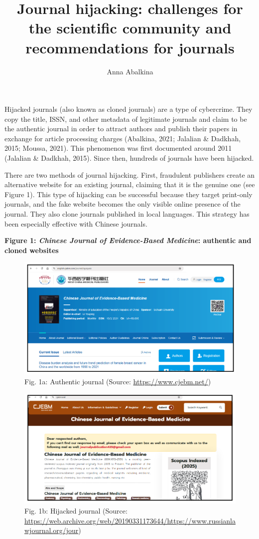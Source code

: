 \documentclass[a4paper,
fontsize=11pt,
oneside,
numbers=noperiodatend,
parskip=half-,
bibliography=totoc,
final
]{scrartcl}
\title{\LARGE{Journal hijacking: challenges for the scientific community and recommendations for journals}}%
\author{Anna Abalkina} %
\date{}
\begin{document}
\maketitle
\thispagestyle{fancyplain} 


Hijacked journals (also known as cloned journals) are a type of
cybercrime. They copy the title, ISSN, and other metadata of legitimate
journals and claim to be the authentic journal in order to attract
authors and publish their papers in exchange for article processing
charges (Abalkina, 2021; Jalalian \& Dadkhah, 2015; Moussa, 2021). This
phenomenon was first documented around 2011 (Jalalian \& Dadkhah, 2015).
Since then, hundreds of journals have been hijacked.

There are two methods of journal hijacking. First, fraudulent publishers
create an alternative website for an existing journal, claiming that it
is the genuine one (see Figure 1). This type of hijacking can be
successful because they target print-only journals, and the fake website
becomes the only visible online presence of the journal. They also clone
journals published in local languages. This strategy has been especially
effective with Chinese journals.

\pagebreak

\textbf{Figure 1: \emph{Chinese Journal of Evidence-Based Medicine}:
authentic and cloned websites}

\begin{figure}[H]
\centering
\includegraphics[width=.7\textwidth]{img/fig1a.png}
\caption{Fig. 1a: Authentic journal (Source: \url{https://www.cjebm.net/})}
\end{figure}

\begin{figure}[H]
\centering
\includegraphics[width=.7\textwidth]{img/fig1b.png}
\caption{Fig. 1b: Hijacked journal (Source: \url{https://web.archive.org/web/20190331173644/https://www.russianlawjournal.org/jour})}
\end{figure}
\end{document}
